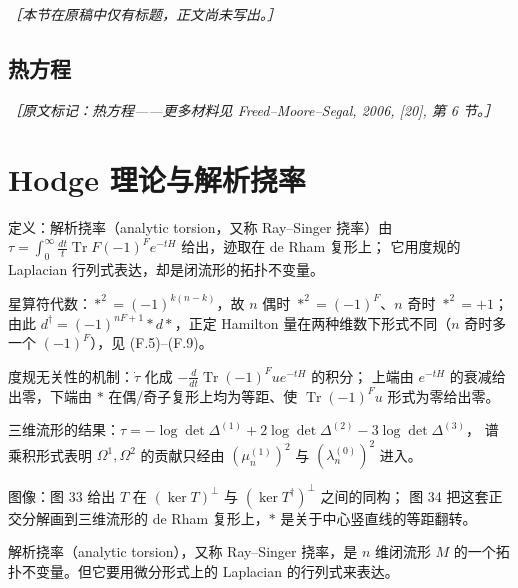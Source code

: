 {\small\itshape ［本节在原稿中仅有标题，正文尚未写出。］}

\subsection{热方程} %

{\small\itshape ［原文标记：热方程——更多材料见 Freed--Moore--Segal, 2006, [20], 第 6 节。］}

\section{Hodge 理论与解析挠率} %

\begin{keytakeaways}
  \item 定义：解析挠率（analytic torsion，又称 Ray--Singer 挠率）由
    $\tau=\int_0^\infty\frac{dt}{t}\operatorname{Tr}F(-1)^Fe^{-tH}$ 给出，迹取在 de Rham 复形上；
    它用度规的 Laplacian 行列式表达，却是闭流形的拓扑不变量。
  \item 星算符代数：$*^2=(-1)^{k(n-k)}$，故 $n$ 偶时 $*^2=(-1)^F$、$n$ 奇时 $*^2=+1$；
    由此 $d^\dagger=(-1)^{nF+1}*d*$，正定 Hamilton 量在两种维数下形式不同（$n$ 奇时多一个 $(-1)^F$），见 (F.5)--(F.9)。
  \item 度规无关性的机制：$\dot\tau$ 化成 $-\frac{d}{dt}\operatorname{Tr}(-1)^Fue^{-tH}$ 的积分；
    上端由 $e^{-tH}$ 的衰减给出零，下端由 $*$ 在偶/奇子复形上均为等距、使 $\operatorname{Tr}(-1)^Fu$ 形式为零给出零。
  \item 三维流形的结果：$\tau=-\log\det\Delta^{(1)}+2\log\det\Delta^{(2)}-3\log\det\Delta^{(3)}$，
    谱乘积形式表明 $\Omega^1,\Omega^2$ 的贡献只经由 $(\mu_n^{(1)})^2$ 与 $(\lambda_n^{(0)})^2$ 进入。
  \item 图像：图 33 给出 $T$ 在 $(\ker T)^\perp$ 与 $(\ker T^\dagger)^\perp$ 之间的同构；
    图 34 把这套正交分解画到三维流形的 de Rham 复形上，$*$ 是关于中心竖直线的等距翻转。
\end{keytakeaways}

解析挠率（analytic torsion），又称 Ray--Singer 挠率，是 $n$ 维闭流形 $M$ 的一个拓扑不变量。但它要用微分形式上的 Laplacian 的行列式来表达。

